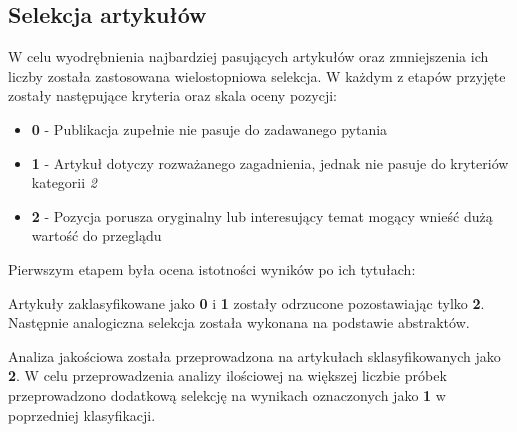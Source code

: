 \subsection{Selekcja artykułów}
W celu wyodrębnienia najbardziej pasujących artykułów oraz zmniejszenia ich liczby została zastosowana wielostopniowa selekcja. W każdym z etapów przyjęte zostały następujące kryteria oraz skala oceny pozycji:
\begin{itemize}
    \item {\bf 0} - Publikacja zupełnie nie pasuje do zadawanego pytania
    \item {\bf 1} - Artykuł dotyczy rozważanego zagadnienia, jednak nie pasuje do kryteriów kategorii {\it 2}
    \item {\bf 2} - Pozycja porusza oryginalny lub interesujący temat mogący wnieść dużą wartość do przeglądu
\end{itemize}
Pierwszym etapem była ocena istotności wyników po ich tytułach:

Artykuły zaklasyfikowane jako {\bf0} i {\bf1} zostały odrzucone pozostawiając tylko {\bf2}. Następnie analogiczna selekcja została wykonana na podstawie abstraktów.

Analiza jakościowa została przeprowadzona na artykułach sklasyfikowanych jako \textbf{2}. W celu przeprowadzenia analizy ilościowej na większej liczbie próbek przeprowadzono dodatkową selekcję na wynikach oznaczonych jako \textbf{1} w poprzedniej klasyfikacji.


